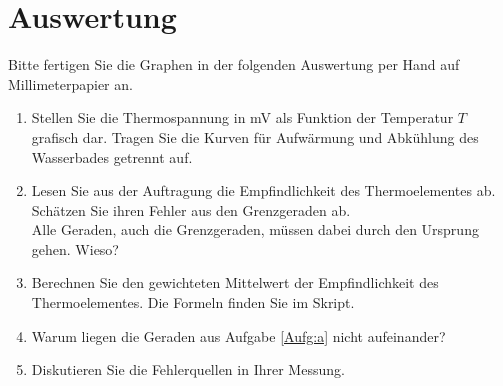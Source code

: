 \section{Auswertung} 

\begin{hint}
	Bitte fertigen Sie die Graphen in der folgenden Auswertung per Hand auf Millimeterpapier an.
\end{hint}

\begin{enumerate}
 \item Stellen Sie die Thermospannung in mV als Funktion der Temperatur $T$ grafisch dar. Tragen Sie die Kurven für Aufwärmung und Abkühlung des Wasserbades getrennt auf. \label{Aufg:a}
 \item Lesen Sie aus der Auftragung die Empfindlichkeit des Thermoelementes ab. Schätzen Sie ihren Fehler aus den Grenzgeraden ab.\\
 Alle Geraden, auch die Grenzgeraden, müssen dabei durch den Ursprung gehen. Wieso?
 \item Berechnen Sie den gewichteten Mittelwert der Empfindlichkeit des Thermoelementes. Die Formeln finden Sie im Skript.
 \item Warum liegen die Geraden aus Aufgabe \ref{Aufg:a} nicht aufeinander?
 \item Diskutieren Sie die Fehlerquellen in Ihrer Messung.
\end{enumerate}